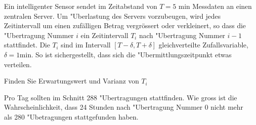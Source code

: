 Ein intelligenter Sensor sendet im Zeitabstand von $T=\text{5 min}$
Messdaten an einen zentralen Server. Um "Uberlastung des Servers
vorzubeugen, wird jedes
Zeitintervall um einen zufälligen Betrag vergrössert oder verkleinert, so
dass die "Ubertragung Nummer $i$ ein Zeitintervall $T_i$ nach "Ubertragung
Nummer $i-1$ stattfindet.
Die $T_i$ sind im Intervall $[T-\delta,T+\delta]$
gleichverteilte Zufallsvariable, $\delta = \text{1min}$.
So ist sichergestellt, dass sich die "Ubermittlungszeitpunkt etwas verteilen.
\begin{teilaufgaben}
\item Finden Sie Erwartungswert und Varianz von $T_i$
\item Pro Tag sollten im Schnitt 288 "Ubertragungen stattfinden. Wie gross
ist die Wahrscheinlichkeit, dass 24 Stunden nach "Ubertragung Nummer $0$
nicht mehr als 280 "Ubetragungen stattgefunden haben.
\end{teilaufgaben}


